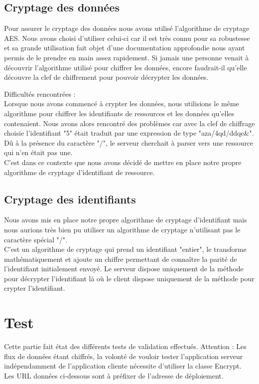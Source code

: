 \subsection{Cryptage des données}
Pour assurer le cryptage des données nous avons utilisé l'algorithme de cryptage AES. Nous avons choisi d'utiliser celui-ci car il est très connu pour sa robustesse et sa grande utilisation fait objet d'une documentation approfondie nous ayant permis de le prendre en main assez rapidement.
Si jamais une personne venait à découvrir l'algorithme utilisé pour chiffrer les données, encore faudrait-il qu'elle découvre la clef de chiffrement pour pouvoir décrypter les données.

Difficultés rencontrées : \\
Lorsque nous avons commencé à crypter les données, nous utilisions le même algorithme pour chiffrer les identifiants de ressources et les données qu'elles contenaient.
Nous avons alors rencontré des problèmes car avec la clef de chiffrage choisie l'identifiant "5" était traduit par une expression de type "aza/4qd/ddqe\&".
Dû à la présence du caractère "/", le serveur cherchait à parser vers une ressource qui n'en était pas une.\\
C'est dans ce contexte que nous avons décidé de mettre en place notre propre algorithme de cryptage d'identifiant de ressource.

\subsection{Cryptage des identifiants}

Nous avons mis en place notre propre algorithme de cryptage d'identifiant mais nous aurions très bien pu utiliser un algorithme de cryptage n'utilisant pas le caractère spécial "/".\\
C'est un algorithme de cryptage qui prend un identifiant "entier", le transforme mathématiquement et ajoute un chiffre permettant de connaître la parité de l'identifiant initialement envoyé.
Le serveur dispose uniquement de la méthode pour décrypter l'identifiant là où le client dispose uniquement de la méthode pour crypter l'identifiant.

\newpage
\section{Test}

Cette partie fait état des différents tests de validation effectués.
Attention : Les flux de données étant chiffrés, la volonté de vouloir tester l'application serveur indépendamment de l'application cliente nécessite d'utiliser la classe Encrypt.\\
Les URL données ci-dessous sont à préfixer de l'adresse de déploiement.

